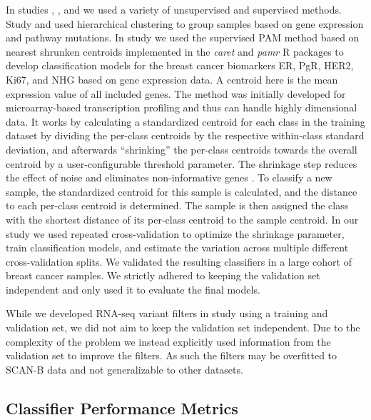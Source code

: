 \documentclass[11pt]{book}
\newcommand{\scanb}{\mbox{SCAN-B}}
\begin{document}
In studies \I, \III, and \IV we used a variety of unsupervised and supervised methods. Study \I and \IV used hierarchical clustering to group samples based on gene expression and pathway mutations. In study \III we used the supervised PAM method based on nearest shrunken centroids \cite{Tibshirani:2002} implemented in the \textit{caret} and \textit{pamr} R packages \cite{pamr, Kuhn:2008-caret} to develop classification models for the breast cancer biomarkers ER, PgR, HER2, Ki67, and NHG based on gene expression data. A centroid here is the mean expression value of all included genes. The method was initially developed for microarray-based transcription profiling and thus can handle highly dimensional data. It works by calculating a standardized centroid for each class in the training dataset by dividing the per-class centroids by the respective within-class standard deviation, and afterwards ``shrinking'' the per-class centroids towards the overall centroid by a user-configurable threshold parameter. The shrinkage step reduces the effect of noise and eliminates non-informative genes \cite{Tibshirani:2002}. To classify a new sample, the standardized centroid for this sample is calculated, and the distance to each per-class centroid is determined. The sample is then assigned the class with the shortest distance of its per-class centroid to the sample centroid. In our study we used repeated cross-validation to optimize the shrinkage parameter, train classification models, and estimate the variation across multiple different cross-validation splits. We validated the resulting classifiers in a large cohort of breast cancer samples. We strictly adhered to keeping the validation set independent and only used it to evaluate the final models.

While we developed RNA-seq variant filters in study \IV using a training and validation set, we did not aim to keep the validation set independent. Due to the complexity of the problem we instead explicitly used information from the validation set to improve the filters. As such the filters may be overfitted to \scanb{} data and not generalizable to other datasets.


\subsection{Classifier Performance Metrics}
\label{subsubsec:classifier-metrics}
\end{document}
